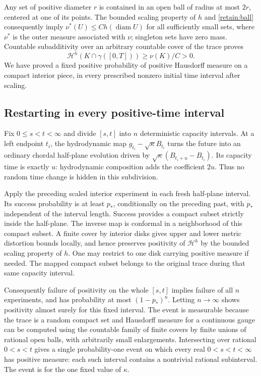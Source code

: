 Any set of positive diameter $r$ is contained in an open ball of
radius at most $2r$, centered at one of its points.  The bounded
scaling property of $h$ and \eqref{retain:ball} consequently imply
$\nu^*(U)\le C h(\operatorname{diam}U)$ for all sufficiently small
sets, where $\nu^*$ is the outer measure associated with $\nu$;
singleton sets have zero mass.  Countable subadditivity over an arbitrary
countable cover of the trace proves
\[
 \mathcal H^h(K\cap\gamma([0,T]))\ge \nu(K)/C>0.
\]
We have proved a fixed positive probability of positive Hausdorff
measure on a compact interior piece, in every prescribed nonzero
initial time interval after scaling.

\subsection{Restarting in every positive-time interval}\label{retain:positivity}

Fix $0\le s<t<\infty$ and divide $[s,t]$ into $n$ deterministic
capacity intervals.  At a left endpoint $t_i$, the hydrodynamic map
$g_{t_i}-\sqrt\kappa B_{t_i}$ turns the future into an ordinary
chordal half-plane evolution driven by
$\sqrt\kappa(B_{t_i+u}-B_{t_i})$.  Its capacity time is exactly $u$:
hydrodynamic composition adds the coefficient $2u$.  Thus no random
time change is hidden in this subdivision.

Apply the preceding scaled interior experiment in each fresh
half-plane interval.  Its success probability is at least $p_*$,
conditionally on the preceding past, with $p_*$ independent of the
interval length.  Success provides a compact subset strictly inside
the half-plane.  The inverse map is conformal in a neighborhood of
this compact subset.  A finite cover by interior disks gives upper
and lower metric distortion bounds locally, and hence preserves
positivity of $\mathcal H^h$ by the bounded scaling property of $h$.
One may restrict to one disk carrying positive measure if needed.
The mapped compact subset belongs to the original trace during that
same capacity interval.

Consequently failure of positivity on the whole $[s,t]$ implies
failure of all $n$ experiments, and has probability at most
$(1-p_*)^n$.  Letting $n\to\infty$ shows positivity almost surely for
this fixed interval.  The event is measurable because the trace is
a random compact set and Hausdorff measure for a continuous gauge
can be computed using the countable family of finite covers by
finite unions of rational open balls, with arbitrarily small
enlargements.  Intersecting over rational $0<s<t$ gives a single
probability-one event on which every real $0<s<t<\infty$ has
positive measure: each such interval contains a nontrivial rational
subinterval.  The event is for the one fixed value of $\kappa$.

